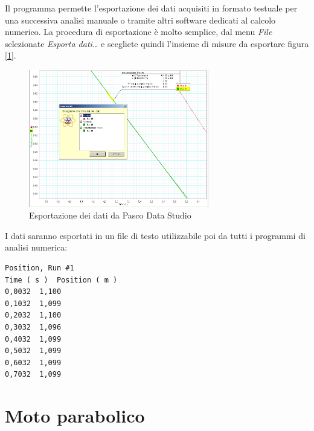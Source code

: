 \documentclass[a4paper,10pt,oneside]{article}
\begin{document}
Il programma permette l'esportazione dei dati acquisiti  in formato testuale per una successiva analisi manuale o tramite altri software dedicati al calcolo numerico. La procedura di esportazione è molto semplice, dal menu \textsl{File} selezionate \textsl{Esporta dati\ldots} e scegliete quindi l'insieme di misure da esportare figura [\ref{fig:pasco_export}].
\begin{figure}
 \centering
 \includegraphics[width=0.7\textwidth]{./Immagini/pasco3.png}
 \caption{Esportazione dei dati da Pasco Data Studio}
 \label{fig:pasco_export}
\end{figure}

I dati saranno esportati in un file di testo utilizzabile poi da tutti i programmi di analisi numerica:
\begin{verbatim}
Position, Run #1
Time ( s )	Position ( m )
0,0032	1,100
0,1032	1,099
0,2032	1,100
0,3032	1,096
0,4032	1,099
0,5032	1,099
0,6032	1,099
0,7032	1,099
\end{verbatim}

\section*{Moto parabolico}
\end{document}
